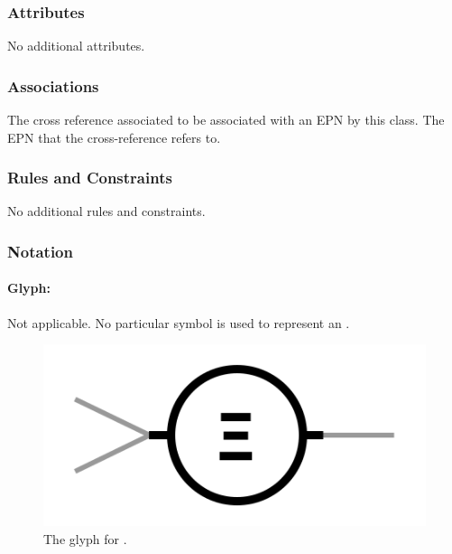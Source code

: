 \subsubsection{Attributes}

No additional attributes.

\subsubsection{Associations}

\begin{attributes}
 The cross reference
associated to be associated with an EPN by this class.
 The EPN that the
cross-reference refers to.
\end{attributes}

\subsubsection{Rules and Constraints}

No additional rules and constraints.

\subsubsection{Notation}

\paragraph{Glyph:  }\label{sec:techref:equivalenceArc}

\begin{glyphDescription}
 \glyphSboTerm Not applicable.
 \glyphEndPoint No particular symbol is used to represent an .
 \end{glyphDescription}

\begin{figure}[htb]
  \centering
  \includegraphics[scale = 0.4]{images/equivalence}
  \caption{The \PD glyph for .}
  \label{fig:techref:equivalence}
\end{figure}

